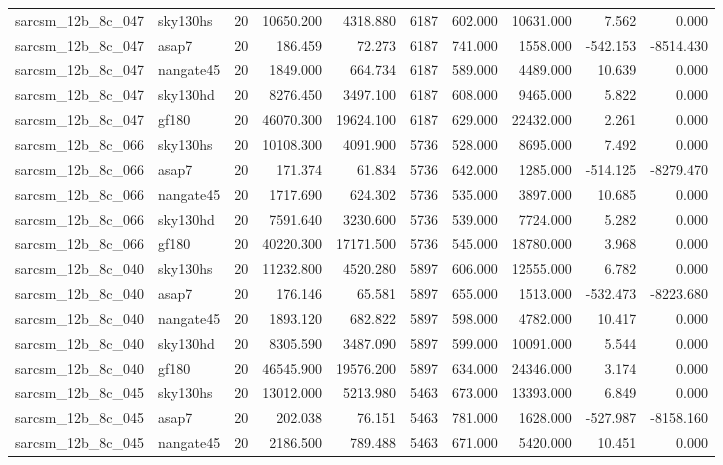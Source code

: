 \documentclass{article}
\begin{document}
\begin{longtable}{llrrrrrrrr}
sarcsm\_12b\_8c\_047 & sky130hs & 20 & 10650.200 & 4318.880 & 6187 & 602.000 & 10631.000 & 7.562 & 0.000 \\
sarcsm\_12b\_8c\_047 & asap7 & 20 & 186.459 & 72.273 & 6187 & 741.000 & 1558.000 & -542.153 & -8514.430 \\
sarcsm\_12b\_8c\_047 & nangate45 & 20 & 1849.000 & 664.734 & 6187 & 589.000 & 4489.000 & 10.639 & 0.000 \\
sarcsm\_12b\_8c\_047 & sky130hd & 20 & 8276.450 & 3497.100 & 6187 & 608.000 & 9465.000 & 5.822 & 0.000 \\
sarcsm\_12b\_8c\_047 & gf180 & 20 & 46070.300 & 19624.100 & 6187 & 629.000 & 22432.000 & 2.261 & 0.000 \\
sarcsm\_12b\_8c\_066 & sky130hs & 20 & 10108.300 & 4091.900 & 5736 & 528.000 & 8695.000 & 7.492 & 0.000 \\
sarcsm\_12b\_8c\_066 & asap7 & 20 & 171.374 & 61.834 & 5736 & 642.000 & 1285.000 & -514.125 & -8279.470 \\
sarcsm\_12b\_8c\_066 & nangate45 & 20 & 1717.690 & 624.302 & 5736 & 535.000 & 3897.000 & 10.685 & 0.000 \\
sarcsm\_12b\_8c\_066 & sky130hd & 20 & 7591.640 & 3230.600 & 5736 & 539.000 & 7724.000 & 5.282 & 0.000 \\
sarcsm\_12b\_8c\_066 & gf180 & 20 & 40220.300 & 17171.500 & 5736 & 545.000 & 18780.000 & 3.968 & 0.000 \\
sarcsm\_12b\_8c\_040 & sky130hs & 20 & 11232.800 & 4520.280 & 5897 & 606.000 & 12555.000 & 6.782 & 0.000 \\
sarcsm\_12b\_8c\_040 & asap7 & 20 & 176.146 & 65.581 & 5897 & 655.000 & 1513.000 & -532.473 & -8223.680 \\
sarcsm\_12b\_8c\_040 & nangate45 & 20 & 1893.120 & 682.822 & 5897 & 598.000 & 4782.000 & 10.417 & 0.000 \\
sarcsm\_12b\_8c\_040 & sky130hd & 20 & 8305.590 & 3487.090 & 5897 & 599.000 & 10091.000 & 5.544 & 0.000 \\
sarcsm\_12b\_8c\_040 & gf180 & 20 & 46545.900 & 19576.200 & 5897 & 634.000 & 24346.000 & 3.174 & 0.000 \\
sarcsm\_12b\_8c\_045 & sky130hs & 20 & 13012.000 & 5213.980 & 5463 & 673.000 & 13393.000 & 6.849 & 0.000 \\
sarcsm\_12b\_8c\_045 & asap7 & 20 & 202.038 & 76.151 & 5463 & 781.000 & 1628.000 & -527.987 & -8158.160 \\
sarcsm\_12b\_8c\_045 & nangate45 & 20 & 2186.500 & 789.488 & 5463 & 671.000 & 5420.000 & 10.451 & 0.000 \\

\end{longtable}
\end{document}
